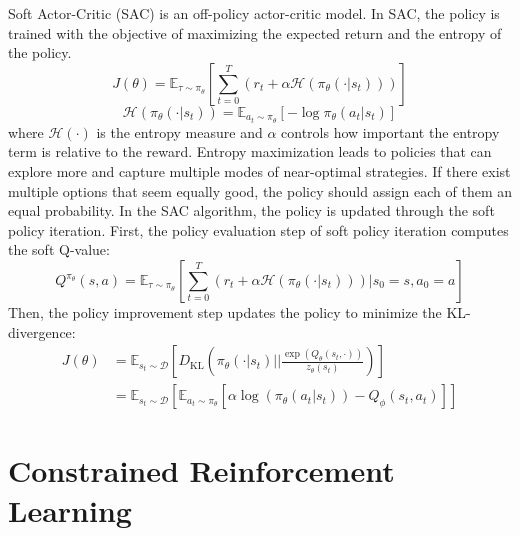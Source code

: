 Soft Actor-Critic (SAC) \cite{SAC1, SAC2, SAC3} is an off-policy actor-critic model.
In SAC, the policy is trained with the objective of maximizing the expected return and the entropy of the policy.
\begin{equation}
  J(\theta) = \mathbb{E}_{\tau \sim \pi_\theta} \left[ \sum^T_{t = 0} (r_t + \alpha \mathcal{H}(\pi_\theta(\cdot|s_t))) \right]
\end{equation}
\begin{equation}
  \mathcal{H}(\pi_\theta(\cdot|s_t)) = \mathbb{E}_{a_t \sim \pi_\theta}[-\log \pi_\theta(a_t|s_t)]
\end{equation}
where $\mathcal{H}(\cdot)$ is the entropy measure and $\alpha$ controls how important the entropy term is relative to the reward.
Entropy maximization leads to policies that can explore more and capture multiple modes of near-optimal strategies.
If there exist multiple options that seem equally good, the policy should assign each of them an equal probability.
In the SAC algorithm, the policy is updated through the soft policy iteration.
First, the policy evaluation step of soft policy iteration computes the soft Q-value:
\begin{equation}
  Q^{\pi_\theta}(s, a) = \mathbb{E}_{\tau \sim \pi_\theta} \left[ \sum^T_{t = 0} \left(r_t + \alpha \mathcal{H}(\pi_\theta(\cdot|s_t))\right) \Big| s_0 = s, a_0 = a \right]
\end{equation}
Then, the policy improvement step updates the policy to minimize the KL-divergence:
\begin{equation}
  \begin{aligned}
    J(\theta)
    &= \mathbb{E}_{s_t \sim \mathcal{D}} \left[ D_\text{KL} \left( \pi_\theta(\cdot|s_t) \Big|\Big| \frac{\exp(Q_\theta(s_t, \cdot))}{z_\theta(s_t)} \right) \right] \\
    &= \mathbb{E}_{s_t \sim \mathcal{D}} \left[ \mathbb{E}_{a_t \sim \pi_\theta} [\alpha \log (\pi_\theta(a_t|s_t)) - Q_\phi(s_t, a_t)] \right]
  \end{aligned}
\end{equation}

\section{Constrained Reinforcement Learning} \label{chap2:sec4}

